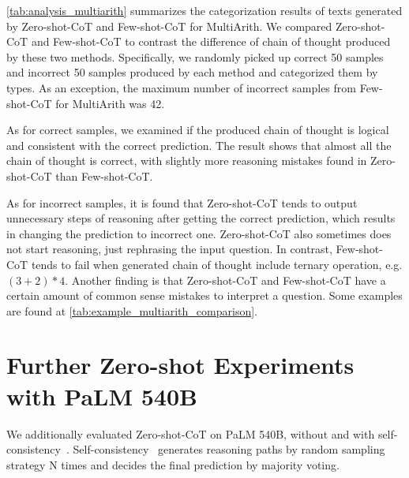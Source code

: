 \documentclass{article}
\newcommand{\CoT}{chain of thought\xspace}
\newcommand{\ours}{Zero-shot-CoT\xspace}
\newcommand{\theirs}{Few-shot-CoT\xspace}
\begin{document}
\autoref{tab:analysis_multiarith} summarizes the categorization results of texts generated by \ours and \theirs for MultiArith. We compared \ours and \theirs to contrast the difference of \CoT produced by these two methods. Specifically, we randomly picked up correct 50 samples and incorrect 50 samples produced by each method and categorized them by types. As an exception, the maximum number of incorrect samples from \theirs for MultiArith was 42. 


As for correct samples, we examined if the produced \CoT is logical and consistent with the correct prediction. The result shows that almost all the \CoT is correct, with slightly more reasoning mistakes found in Zero-shot-CoT than Few-shot-CoT.

As for incorrect samples, it is found that \ours tends to output unnecessary steps of reasoning after getting the correct prediction, which results in changing the prediction to incorrect one. 
\ours also sometimes does not start reasoning, just rephrasing the input question.
In contrast, \theirs tends to fail when generated \CoT include ternary operation, e.g. $(3+2)*4$. Another finding is that \ours and \theirs have a certain amount of common sense mistakes to interpret a question. Some examples are found at \autoref{tab:example_multiarith_comparison}.


%
%


\clearpage

\section{Further Zero-shot Experiments with PaLM 540B}
\label{appx:further_experiment_on_palm}


We additionally evaluated \ours on PaLM 540B, without and with self-consistency~\citep{cot_wei_sc}. Self-consistency~\citep{cot_wei_sc} generates reasoning paths by random sampling strategy N times and decides the final prediction by majority voting.
\end{document}
